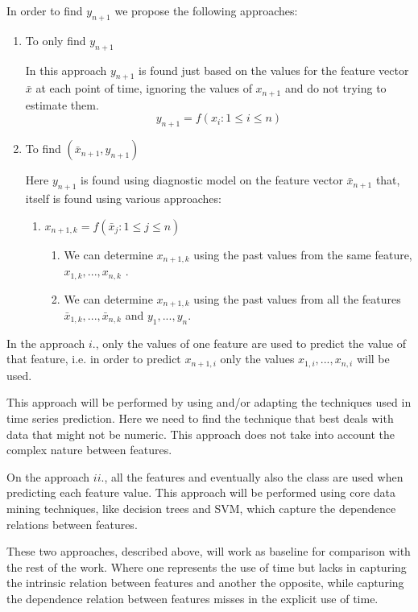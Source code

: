 In order to find $y_{n+1}$ we propose the following approaches:
\begin{enumerate}
\item{ To only find $y_{n+1}$

In this approach $y_{n+1}$ is found just based on the values for the feature vector $\bar{x}$ at each point of time, ignoring the values of $x_{n+1}$
  and do not trying to estimate them.
\begin{equation}
	y_{n+1} = f(x_{i} :1 \leq i \leq n)
\label{eq:approach1}
\end{equation}
  }
\item{ To find $(\bar{x}_{n+1},y_{n+1})$
	
Here  $y_{n+1}$ is found using diagnostic model on the feature vector $\bar{x}_{n+1}$ that, itself is found using various approaches:
	\begin{enumerate}
		\item{ $x_{n+1,k}=f(\bar{x}_j:1\leq j \leq n)$
		\begin{enumerate}
			\item{We can determine $x_{n+1,k}$ using the past values from the same feature, $x_{1,k},..., x_{n,k}$ . }
			\item{We can determine $x_{n+1,k}$ using the past values from all the features $\bar{x}_{1,k},..., \bar{x}_{n,k}$ and $y_1,...,y_n$.}
		\end{enumerate}
		}
	\end{enumerate}
}
\end{enumerate}

In the approach $i.$, only the values of one feature are used to predict the value of that feature, i.e. in order to predict $x_{n+1,i}$ only 
the values $x_{1,i},..., x_{n,i}$ will be used. 

This approach will be performed by using and/or adapting the techniques used in time series prediction. Here we need to find the technique 
that best deals with data that might not be numeric. This approach does not take into account the complex nature between features. 

On the approach $ii.$, all the features and eventually also the class are used when predicting each feature value. This approach will be 
performed using core data mining techniques, like decision trees and SVM, which capture the dependence relations between features.

These two approaches, described above, will work as baseline for comparison with the rest of the work. Where one represents the use of 
time but lacks in capturing the intrinsic relation between features and another the opposite, while capturing the dependence relation 
between features misses in the explicit use of time.

